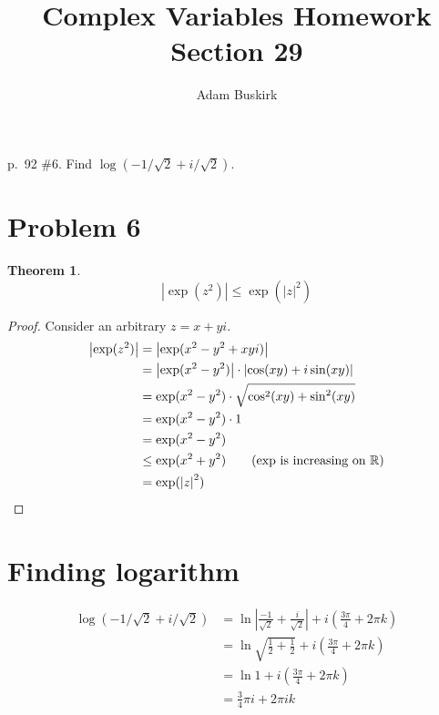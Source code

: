 \documentclass{article}
\title{Complex Variables Homework Section 29}
\author{Adam Buskirk}
\newtheorem{theorem}[subsection]{Theorem}
\theoremstyle{definition}
\newcommand{\R}{\mathbb{R}}
\newcommand{\p}[1]{\left(#1\right)}
\newcommand{\abs}[1]{\left|#1\right|}
\begin{document}
\maketitle

p.\ 92 \#6. Find $\log(-1/\sqrt{2}+i/\sqrt{2})$.

\section{Problem 6}
\begin{theorem}
\[ \abs{\exp(z^2)} \le \exp(\abs{z}^2) \]
\end{theorem}
\begin{proof}
Consider an arbitrary $z=x+yi$.
\begin{align*}
\abs{\exp(z^2)}
&= \abs{\exp(x^2-y^2+xyi)} \\
&= \abs{\exp(x^2-y^2)} \cdot \abs{\cos(xy)+i\sin(xy)}\\
&= \exp(x^2-y^2) \cdot \sqrt{\cos^2(xy)+\sin^2(xy)} \\
&= \exp(x^2-y^2) \cdot 1 \\
&= \exp(x^2-y^2) \\
&\le \exp(x^2+y^2) \tag{$\exp$ is increasing on $\R$}\\
&= \exp(\abs{z}^2)
\end{align*}
\end{proof}

\section{Finding logarithm}
\begin{align*}
\log(-1/\sqrt{2}+i/\sqrt{2})
&= \ln\abs{\frac{-1}{\sqrt{2}} + \frac{i}{\sqrt{2}}} + i \p{\frac{3\pi}{4}+2\pi k} \\
&= \ln\sqrt{\frac{1}{2}+\frac{1}{2}} + i\p{\frac{3\pi}{4} + 2 \pi k} \\
&= \ln 1 + i\p{\frac{3\pi}{4} + 2 \pi k} \\
&= \frac{3}{4} \pi i + 2\pi i k
\end{align*}
\end{document}
